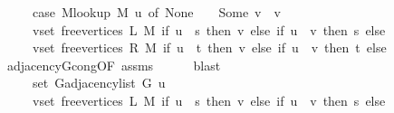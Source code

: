 \begin{isabellebody}
\ \ \ \ \ {\isacharparenleft}{\kern0pt}case\ M{\isacharunderscore}{\kern0pt}lookup\ M\ u\ of\ None\ {\isasymRightarrow}\ {\isacharbraceleft}{\kern0pt}{\isacharbraceright}{\kern0pt}\ {\isacharbar}{\kern0pt}\ Some\ v\ {\isasymRightarrow}\ {\isacharbraceleft}{\kern0pt}v{\isacharbraceright}{\kern0pt}{\isacharparenright}{\kern0pt}\ {\isasymunion}\isanewline
\ \ \ \ \ {\isacharparenleft}{\kern0pt}{\isasymUnion}v{\isasymin}set\ {\isacharparenleft}{\kern0pt}free{\isacharunderscore}{\kern0pt}vertices\ L\ M{\isacharparenright}{\kern0pt}{\isachardot}{\kern0pt}\ if\ u\ {\isacharequal}{\kern0pt}\ s\ then\ {\isacharbraceleft}{\kern0pt}v{\isacharbraceright}{\kern0pt}\ else\ if\ u\ {\isacharequal}{\kern0pt}\ v\ then\ {\isacharbraceleft}{\kern0pt}s{\isacharbraceright}{\kern0pt}\ else\ {\isacharbraceleft}{\kern0pt}{\isacharbraceright}{\kern0pt}{\isacharparenright}{\kern0pt}\ {\isasymunion}\isanewline
\ \ \ \ \ {\isacharparenleft}{\kern0pt}{\isasymUnion}v{\isasymin}set\ {\isacharparenleft}{\kern0pt}free{\isacharunderscore}{\kern0pt}vertices\ R\ M{\isacharparenright}{\kern0pt}{\isachardot}{\kern0pt}\ if\ u\ {\isacharequal}{\kern0pt}\ t\ then\ {\isacharbraceleft}{\kern0pt}v{\isacharbraceright}{\kern0pt}\ else\ if\ u\ {\isacharequal}{\kern0pt}\ v\ then\ {\isacharbraceleft}{\kern0pt}t{\isacharbraceright}{\kern0pt}\ else\ {\isacharbraceleft}{\kern0pt}{\isacharbraceright}{\kern0pt}{\isacharparenright}{\kern0pt}{\isachardoublequoteclose}\isanewline
\ \ \ \ \isamarkupfalse%
\ adjacency{\isacharunderscore}{\kern0pt}G{}{\isacharunderscore}{\kern0pt}cong{\isacharbrackleft}{\kern0pt}OF\ assms{\isacharparenleft}{\kern0pt}{}{\isacharparenright}{\kern0pt}{\isacharbrackright}{\kern0pt}\isanewline
\ \ \ \ \isamarkupfalse%
\ blast\isanewline
\ \ \isamarkupfalse%
\ \isamarkupfalse%
\isanewline
\ \ \ \ {\isachardoublequoteopen}{\isachardot}{\kern0pt}{\isachardot}{\kern0pt}{\isachardot}{\kern0pt}\ {\isacharequal}{\kern0pt}\isanewline
\ \ \ \ \ set\ {\isacharparenleft}{\kern0pt}G{\isachardot}{\kern0pt}adjacency{\isacharunderscore}{\kern0pt}list\ G\ u{\isacharparenright}{\kern0pt}\ {\isasymunion}\isanewline
\ \ \ \ \ {\isacharparenleft}{\kern0pt}{\isasymUnion}v{\isasymin}set\ {\isacharparenleft}{\kern0pt}free{\isacharunderscore}{\kern0pt}vertices\ L\ M{\isacharparenright}{\kern0pt}{\isachardot}{\kern0pt}\ if\ u\ {\isacharequal}{\kern0pt}\ s\ then\ {\isacharbraceleft}{\kern0pt}v{\isacharbraceright}{\kern0pt}\ else\ if\ u\ {\isacharequal}{\kern0pt}\ v\ then\ {\isacharbraceleft}{\kern0pt}s{\isacharbraceright}{\kern0pt}\ else\ {\isacharbraceleft}{\kern0pt}{\isacharbraceright}{\kern0pt}{\isacharparenright}{\kern0pt}\ {\isasymunion}\isanewline

\end{isabellebody}
